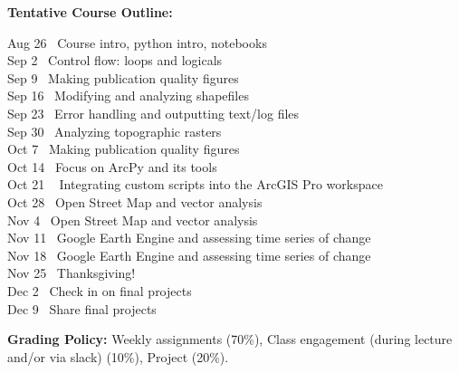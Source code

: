 \documentclass[11pt, a4paper]{article}
\begin{document}
\vspace*{.15in}

\noindent \textbf{Tentative Course Outline:}
\begin{center} 
\begin{minipage}{5in}
\begin{flushleft}

Aug 26 \dotfill ~Course intro, python intro, notebooks \\
Sep 2 \dotfill ~Control flow: loops and logicals \\
Sep 9 \dotfill ~Making publication quality figures \\
Sep 16 \dotfill ~Modifying and analyzing shapefiles \\
Sep 23 \dotfill ~Error handling and outputting text/log files\\
Sep 30 \dotfill ~Analyzing topographic rasters \\
Oct 7 \dotfill ~Making publication quality figures \\
Oct 14 \dotfill ~Focus on ArcPy and its tools \\
Oct 21 \dotfill ~ Integrating custom scripts into the ArcGIS Pro workspace\\
Oct 28 \dotfill ~Open Street Map and vector analysis \\
Nov 4 \dotfill ~Open Street Map and vector analysis \\
Nov 11 \dotfill ~Google Earth Engine and assessing time series of change \\
Nov 18 \dotfill ~Google Earth Engine and assessing time series of change \\
Nov 25 \dotfill ~Thanksgiving! \\
Dec 2 \dotfill ~Check in on final projects \\
Dec 9 \dotfill ~Share final projects \\


\end{flushleft}
\end{minipage}
\end{center}

\vspace*{.15in}
\noindent\textbf{Grading Policy:} Weekly assignments (70\%),  Class engagement (during lecture and/or via slack) (10\%), Project (20\%). %

\end{document}

